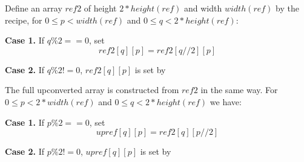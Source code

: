 Define an array $ref2$ of height $2*height(ref)$ and width $width(ref)$ by
the recipe, for $0\leq p<width(ref)$ and $0\leq q<2*height(ref)$:

{\bf Case 1.} If $q\%2==0$, set
\begin{equation*}
ref2[q][p]=ref2[q//2][p]
\end{equation*}

{\bf Case 2.} If $q\%2!=0$, $ref2[q][p]$ is set by

\begin{pseudo*}
\end{pseudo*}

The full upconverted array is constructed from $ref2$ in the same way.
 For $0\leq p<2*width(ref)$ and $0\leq q<2*height(ref)$ we have:

{\bf Case 1.} If $p\%2==0$, set
\begin{equation*}
upref[q][p]=ref2[q][p//2]
\end{equation*}

{\bf Case 2.} If $p\%2!=0$, $upref[q][p]$ is set by

\begin{pseudo*}
\end{pseudo*}

